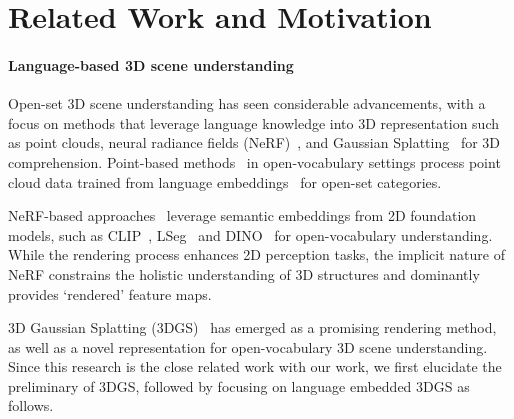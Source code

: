 \section{Related Work and Motivation}
\label{sec:related_works}

\paragraph{Language-based 3D scene understanding}
Open-set 3D scene understanding has seen considerable advancements, with a focus on methods that leverage language knowledge into 3D representation such as point clouds, neural radiance fields (NeRF)~\cite{nerf}, and Gaussian Splatting~\cite{3dgs} for 3D comprehension. Point-based methods~\cite{regionplc,ov3d,open_scene,concept_fusion, ding2023pla, liu2023partslip, zhang2023clip} in open-vocabulary settings process point cloud data trained from language embeddings~\cite{clip,lseg} for open-set categories. 

NeRF-based approaches~\cite{lerf,liu2023weakly,kobayashi2022decomposing,opennerf,lerftogo2023} leverage semantic embeddings from 2D foundation models, such as CLIP~\cite{clip}, LSeg~\cite{lseg} and DINO~\cite{dino} for open-vocabulary understanding. While the rendering process enhances 2D perception tasks, the implicit nature of NeRF constrains the holistic understanding of 3D structures and dominantly provides `rendered' feature maps. 

3D Gaussian Splatting (3DGS)~\cite{3dgs} has emerged as a promising rendering method, as well as a novel representation for open-vocabulary 3D scene understanding. 
Since this research is the close related work with our work, we first elucidate the preliminary of 3DGS, followed by focusing on language embedded 3DGS as follows.

